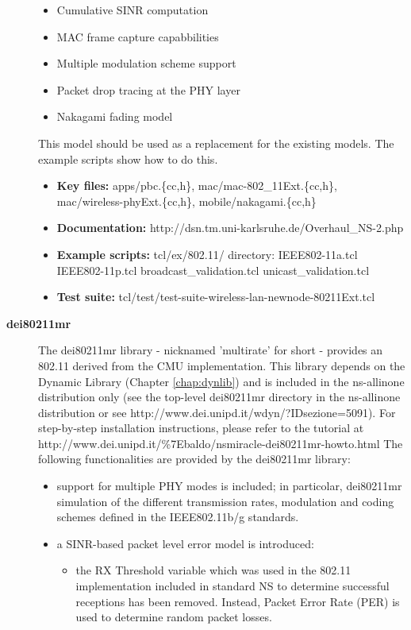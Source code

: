 \begin{description}
\begin{itemize}
\item Cumulative SINR computation
\item MAC frame capture capabbilities
\item Multiple modulation scheme support
\item Packet drop tracing at the PHY layer
\item Nakagami fading model
\end{itemize}
This model should be used as a replacement for the existing models.  The
example scripts show how to do this.
\begin{itemize}
\item {\bf Key files:}  apps/pbc.\{cc,h\}, mac/mac-802\_11Ext.\{cc,h\}, mac/wireless-phyExt.\{cc,h\}, mobile/nakagami.\{cc,h\}
\item {\bf Documentation:}  http://dsn.tm.uni-karlsruhe.de/Overhaul\_NS-2.php
\item {\bf Example scripts:}  tcl/ex/802.11/ directory:  IEEE802-11a.tcl IEEE802-11p.tcl broadcast\_validation.tcl unicast\_validation.tcl
\item {\bf Test suite:}  tcl/test/test-suite-wireless-lan-newnode-80211Ext.tcl
\end{itemize}
\item[{\bf dei80211mr}]
The dei80211mr library - nicknamed 'multirate' for short - provides an 
802.11 derived from the CMU implementation.
This library depends on the Dynamic Library (Chapter \ref{chap:dynlib}) and
is included in the ns-allinone distribution only (see the 
top-level dei80211mr directory in the ns-allinone distribution or
see http://www.dei.unipd.it/wdyn/?IDsezione=5091).
For step-by-step installation instructions, please refer to the tutorial at
http://www.dei.unipd.it/\%7Ebaldo/nsmiracle-dei80211mr-howto.html
The following functionalities are provided by the dei80211mr library:
\begin{itemize}
\item support for multiple PHY modes is included; in particolar, dei80211mr simulation of the different transmission rates, modulation and coding schemes defined in the IEEE802.11b/g standards.
\item a SINR-based packet level error model is introduced:
\begin{itemize}
          \item the RX Threshold variable which was used in the 802.11 implementation included in standard NS to determine successful receptions has been removed. Instead, Packet Error Rate (PER) is used to determine random packet losses.

\end{itemize}
\end{itemize}
\end{description}
